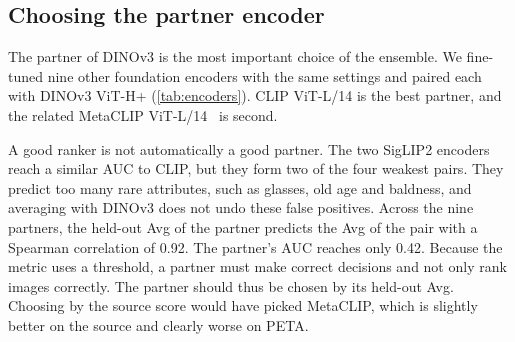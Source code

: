 \documentclass[10pt,twocolumn,letterpaper]{article}
\begin{document}
\begin{table}[t]
\centering\small
\setlength{\tabcolsep}{3pt}
\caption{Building the system step by step. AUC does not depend on the thresholds and is given once per model.}
\label{tab:main}
\end{table}

\subsection{Choosing the partner encoder}
\label{sec:exp_partner}

The partner of DINOv3 is the most important choice of the ensemble. We fine-tuned nine other foundation encoders with the same settings and paired each with DINOv3 ViT-H+ (\cref{tab:encoders}). CLIP ViT-L/14 is the best partner, and the related MetaCLIP ViT-L/14~\cite{metaclip} is second.

A good ranker is not automatically a good partner. The two SigLIP2 encoders~\cite{siglip2} reach a similar AUC to CLIP, but they form two of the four weakest pairs. They predict too many rare attributes, such as glasses, old age and baldness, and averaging with DINOv3 does not undo these false positives. Across the nine partners, the held-out Avg of the partner predicts the Avg of the pair with a Spearman correlation of 0.92. The partner's AUC reaches only 0.42. Because the metric uses a threshold, a partner must make correct decisions and not only rank images correctly. The partner should thus be chosen by its held-out Avg. Choosing by the source score would have picked MetaCLIP, which is slightly better on the source and clearly worse on PETA.
\end{document}
